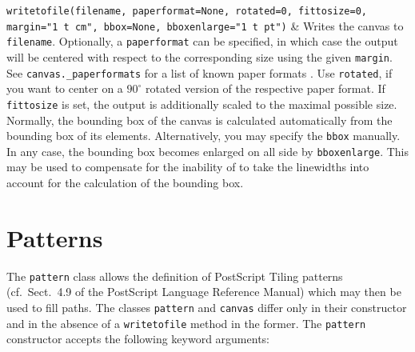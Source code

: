 \begin{tabularx}
    \texttt{writetofile(filename, 
      \newline\phantom{writetofile(}paperformat=None, 
      \newline\phantom{writetofile(}rotated=0,
      \newline\phantom{writetofile(}fittosize=0, 
      \newline\phantom{writetofile(}margin="1 t cm",
      \newline\phantom{writetofile(}bbox=None,
      \newline\phantom{writetofile(}bboxenlarge="1 t pt")} &
  Writes the canvas to \texttt{filename}. Optionally, a
  \texttt{paperformat} can be specified, in which case the output will
  be centered with respect to the corresponding size using the given
  \texttt{margin}. See \texttt{canvas.\_paperformats} for a list of
  known paper formats . Use \texttt{rotated}, if you want to center on
  a $90^\circ$ rotated version of the respective paper format. If
  \texttt{fittosize} is set, the output is additionally scaled to the
  maximal possible size. Normally, the bounding box of the canvas is 
  calculated automatically from the bounding box of its elements.
  Alternatively, you may specify the \texttt{bbox} manually. In any
  case, the bounding box becomes enlarged on all side by
  \texttt{bboxenlarge}. This may be used to compensate for the
  inability of \PyX{} to take the linewidths into account for the
  calculation of the bounding box.
\end{tabularx} 
\medskip

\section{Patterns}

The \texttt{pattern} class allows the definition of PostScript Tiling
patterns (cf.\ Sect.~4.9 of the PostScript Language Reference Manual)
which may then be used to fill paths. The classes \texttt{pattern} and
\texttt{canvas} differ only in their constructor and in the absence of
a \texttt{writetofile} method in the former. The \texttt{pattern}
constructor accepts the following keyword arguments:

